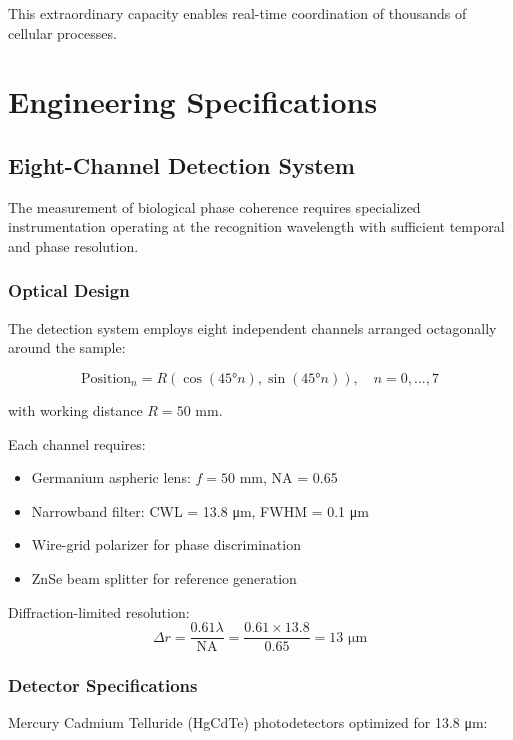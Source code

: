 \documentclass[12pt,twocolumn]{article}
\begin{document}
This extraordinary capacity enables real-time coordination of thousands of cellular processes.

\section{Engineering Specifications}

\subsection{Eight-Channel Detection System}

The measurement of biological phase coherence requires specialized instrumentation operating at the recognition wavelength with sufficient temporal and phase resolution.

\subsubsection{Optical Design}

The detection system employs eight independent channels arranged octagonally around the sample:

\begin{equation}
\text{Position}_n = R(\cos(45° n), \sin(45° n)), \quad n = 0, ..., 7
\end{equation}

with working distance $R = 50$ mm.

Each channel requires:
\begin{itemize}
\item Germanium aspheric lens: $f = 50$ mm, NA = 0.65
\item Narrowband filter: CWL = 13.8 μm, FWHM = 0.1 μm
\item Wire-grid polarizer for phase discrimination
\item ZnSe beam splitter for reference generation
\end{itemize}

Diffraction-limited resolution:
\begin{equation}
\Delta r = \frac{0.61 \lambda}{\text{NA}} = \frac{0.61 \times 13.8}{0.65} = 13 \text{ μm}
\end{equation}

\subsubsection{Detector Specifications}

Mercury Cadmium Telluride (HgCdTe) photodetectors optimized for 13.8 μm:
\end{document}

